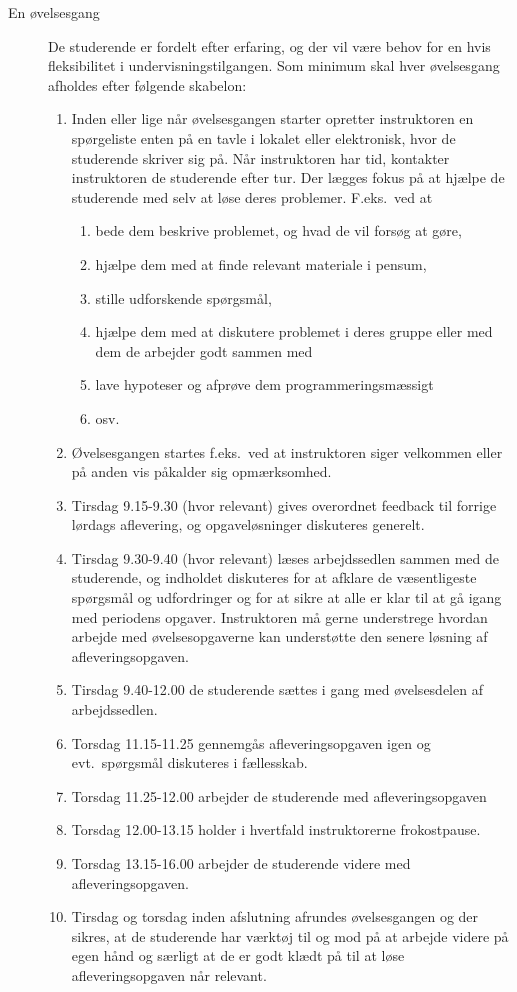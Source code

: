 \documentclass[a4paper]{article}
\begin{document}
\begin{description}
\item[En øvelsesgang] De studerende er fordelt efter erfaring, og der
  vil være behov for en hvis fleksibilitet i undervisningstilgangen.
  Som minimum skal hver øvelsesgang afholdes efter følgende skabelon:
  \begin{enumerate}
  \item Inden eller lige når øvelsesgangen starter opretter
    instruktoren en spørgeliste enten på en tavle i lokalet eller
    elektronisk, hvor de studerende skriver sig på. Når instruktoren
    har tid, kontakter instruktoren de studerende efter tur. Der
    lægges fokus på at hjælpe de studerende med selv at løse deres
    problemer. F.eks.\ ved at
    \begin{enumerate}
    \item bede dem beskrive problemet, og hvad de vil forsøg at gøre,
    \item hjælpe dem med at finde relevant materiale i pensum,
    \item stille udforskende spørgsmål, 
    \item hjælpe dem med at diskutere problemet i deres gruppe eller
      med dem de arbejder godt sammen med
    \item lave hypoteser og afprøve dem programmeringsmæssigt
    \item osv.
    \end{enumerate}
  \item Øvelsesgangen startes f.eks.\ ved at instruktoren siger
    velkommen eller på anden vis påkalder sig opmærksomhed.
  \item Tirsdag 9.15-9.30 (hvor relevant) gives overordnet feedback
    til forrige lørdags aflevering, og opgaveløsninger diskuteres
    generelt.
  \item Tirsdag 9.30-9.40 (hvor relevant) læses arbejdssedlen sammen
    med de studerende, og indholdet diskuteres for at afklare de
    væsentligeste spørgsmål og udfordringer og for at sikre at alle er
    klar til at gå igang med periodens opgaver. Instruktoren må gerne
    understrege hvordan arbejde med øvelsesopgaverne kan understøtte
    den senere løsning af afleveringsopgaven.
  \item Tirsdag 9.40-12.00 de studerende sættes i gang med
    øvelsesdelen af arbejdssedlen.
  \item Torsdag 11.15-11.25 gennemgås afleveringsopgaven igen og evt.\
    spørgsmål diskuteres i fællesskab.
  \item Torsdag 11.25-12.00 arbejder de studerende med afleveringsopgaven
  \item Torsdag 12.00-13.15 holder i hvertfald instruktorerne frokostpause.
  \item Torsdag 13.15-16.00 arbejder de studerende videre med afleveringsopgaven.
  \item Tirsdag og torsdag inden afslutning afrundes øvelsesgangen og
    der sikres, at de studerende har værktøj til og mod på at arbejde
    videre på egen hånd og særligt at de er godt klædt på til at løse
    afleveringsopgaven når relevant.
  \end{enumerate}
  

\end{description}
\end{document}
